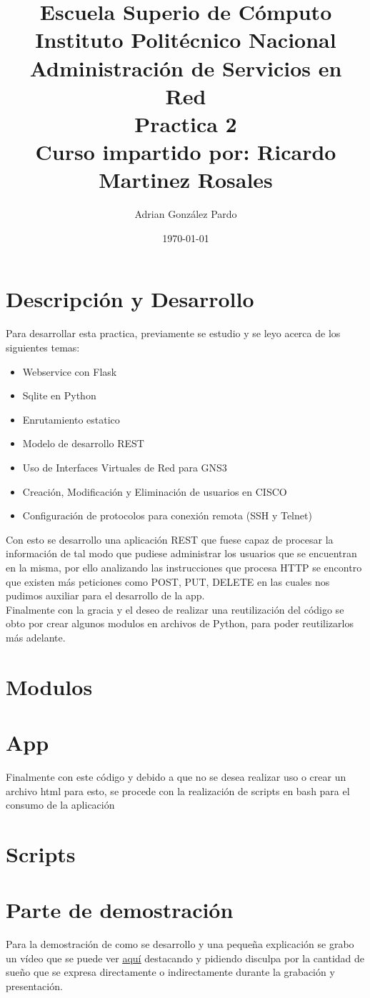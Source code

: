 \documentclass[10pt]{article}
\title{Escuela Superio de Cómputo\\Instituto Politécnico Nacional\\Administración de Servicios en Red\\Practica 2\\Curso impartido por: Ricardo Martinez Rosales}
\author{Adrian González Pardo}
\date{\today}
\begin{document}
\maketitle
\section{Descripción y Desarrollo}
Para desarrollar esta practica, previamente se estudio y se leyo acerca de los siguientes temas:
\begin{itemize}
  \item Webservice con Flask
  \item Sqlite en Python
  \item Enrutamiento estatico
  \item Modelo de desarrollo REST
  \item Uso de Interfaces Virtuales de Red para GNS3
  \item Creación, Modificación y Eliminación de usuarios en CISCO
  \item Configuración de protocolos para conexión remota (SSH y Telnet)
\end{itemize}
Con esto se desarrollo una aplicación REST que fuese capaz de procesar la información de tal modo que pudiese administrar los usuarios que se encuentran en la misma, por ello analizando las instrucciones que procesa HTTP se encontro que existen más peticiones como POST, PUT, DELETE en las cuales nos pudimos auxiliar para el desarrollo de la app. \\
Finalmente con la gracia y el deseo de realizar una reutilización del código se obto por crear algunos modulos en archivos de Python, para poder reutilizarlos más adelante.
\section{Modulos}


\section{App}


Finalmente con este código y debido a que no se desea realizar uso o crear un archivo html para esto, se procede con la realización de scripts en bash para el consumo de la aplicación
\section{Scripts}



\section{Parte de demostración}
Para la demostración de como se desarrollo y una pequeña explicación se grabo un vídeo que se puede ver \underline{\href{https://youtu.be/adFZNEVpoVw}{aquí}} destacando y pidiendo disculpa por la cantidad de sueño que se expresa directamente o indirectamente durante la grabación y presentación.
\end{document}
